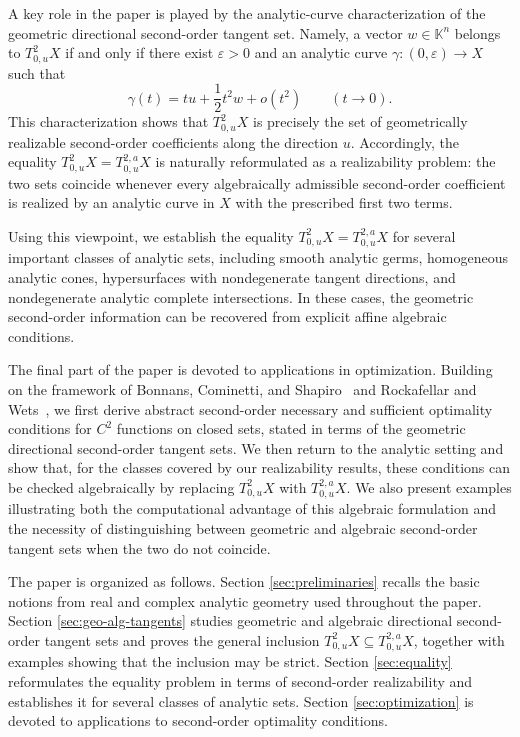 \documentclass[10pt,reqno]{amsart}
\theoremstyle{break-italic}
\theoremstyle{break-italic}
\theoremstyle{break-italic}
\theoremstyle{break-italic}
\theoremstyle{break-italic}
\theoremstyle{break-italic}
\theoremstyle{break-italic}
\theoremstyle{break-italic}
\theoremstyle{break-roman}
\theoremstyle{standard}
\theoremstyle{varthm-roman}
\theoremstyle{varthm-italic}
\theoremstyle{varthm-roman-break}
\theoremstyle{varthm-italic-break}
\theoremstyle{varthm-roman-no-punctuation}
\theoremstyle{varthm-italic-no-punctuation}
\numberwithin{equation}{section}
\begin{document}
A key role in the paper is played by the analytic-curve characterization of the geometric directional second-order tangent set. Namely, a vector $w\in \mathbb K^n$ belongs to $T^2_{0,u}X$ if and only if there exist
$\varepsilon>0$ and an analytic curve $\gamma:(0,\varepsilon)\to X$ such that 
\[
\gamma(t)=tu+\frac12 t^2w+o(t^2)
\qquad (t\to 0).
\]
This characterization shows that $T^2_{0,u}X$ is precisely the set of geometrically realizable second-order coefficients along the direction $u$. Accordingly, the equality
\(
T^2_{0,u}X=T^{2,a}_{0,u}X
\)
is naturally reformulated as a realizability problem: the two sets coincide whenever every algebraically admissible second-order coefficient is realized by an analytic curve in $X$ with the prescribed first two terms.

Using this viewpoint, we establish the equality
\(
T^2_{0,u}X=T^{2,a}_{0,u}X
\)
for several important classes of analytic sets, including smooth analytic germs, homogeneous analytic cones, hypersurfaces with nondegenerate tangent directions, and nondegenerate analytic complete intersections. In these cases,
the geometric second-order information can be recovered from explicit affine algebraic conditions.

The final part of the paper is devoted to applications in optimization.  Building on the framework of Bonnans, Cominetti, and Shapiro~\cite{BCS99} and Rockafellar and Wets~\cite{RoWe97}, we first derive abstract second-order necessary and sufficient optimality conditions for $C^2$ functions on closed sets, stated in terms of the geometric directional second-order tangent sets. We then return to the analytic setting and show that, for the classes covered by our realizability results, these conditions can be checked algebraically by replacing $T^2_{0,u}X$ with $T^{2,a}_{0,u}X$. We also present examples illustrating both the computational advantage of this algebraic formulation and the necessity of distinguishing between geometric and algebraic second-order tangent sets when the two do not coincide.

The paper is organized as follows. Section \ref{sec:preliminaries} recalls the basic notions from real and complex analytic geometry used throughout the paper. Section \ref{sec:geo-alg-tangents} studies geometric and algebraic directional second-order tangent sets and proves the general inclusion $T^2_{0,u}X\subseteq T^{2,a}_{0,u}X$, together with examples showing that the inclusion may be strict. Section \ref{sec:equality} reformulates the equality problem in terms of second-order realizability and establishes it for several classes of analytic sets. Section \ref{sec:optimization} is devoted to applications to second-order optimality conditions.
 
\end{document}
